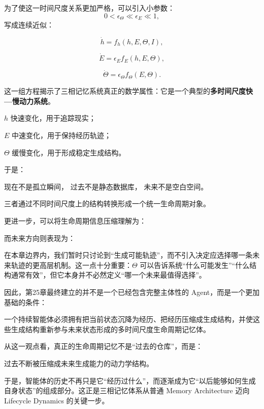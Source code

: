 为了使这一时间尺度关系更加严格，可以引入小参数：
\[
0<\epsilon_\Theta\ll\epsilon_E\ll1,
\]
写成连续近似：

\[
\dot h
=
f_h(h,E,\Theta,I),
\]

\[
\dot E
=
\epsilon_E
f_E(h,E,\Theta),
\]

\[
\dot\Theta
=
\epsilon_\Theta
f_\Theta(E,\Theta).
\]

这一组方程揭示了三相记忆系统真正的数学属性：它是一个典型的\textbf{多时间尺度快—慢动力系统}。

\(h\) 快速变化，用于追踪现实；

\(E\) 中速变化，用于保持经历轨迹；

\(\Theta\) 缓慢变化，用于形成稳定生成结构。

于是：
\begin{statementbox}
现在不是孤立瞬间，
过去不是静态数据库，
未来不是空白空间。
\end{statementbox}

三者通过不同时间尺度上的结构转换形成一个统一生命周期对象。

更进一步，可以将生命周期信息压缩理解为：

\begin{statementbox}
\centering
{}
\end{statementbox}

而未来方向则表现为：

\begin{statementbox}
\centering
{}
\end{statementbox}

在本章边界内，我们暂时只讨论到“生成可能轨迹”，而不引入决定应选择哪一条未来轨迹的更高层机制。这一点十分重要：\(\Theta\) 可以告诉系统“什么可能发生”“什么结构通常有效”，但它本身并不必然定义“哪一个未来最值得选择”。

因此，第25章最终建立的并不是一个已经包含完整主体性的 Agent，而是一个更加基础的条件：

\begin{statementbox}
一个持续智能体必须拥有把当前状态沉降为经历、把经历压缩成生成结构，并使这些生成结构重新参与未来状态形成的多时间尺度生命周期记忆体。
\end{statementbox}

从这一观点看，真正的生命周期记忆不是“过去的仓库”，而是：

\begin{statementbox}
过去不断被压缩成未来生成能力的动力学结构。
\end{statementbox}

于是，智能体的历史不再只是它“经历过什么”，而逐渐成为它“以后能够如何生成自身状态”的组成部分。这正是三相记忆体系从普通 Memory Architecture 迈向 Lifecycle Dynamics 的关键一步。
